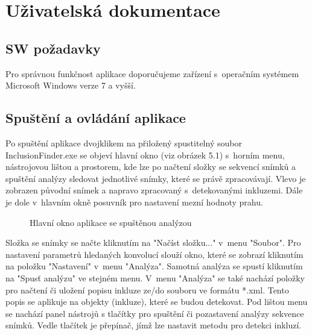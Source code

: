 \documentclass[12pt, a4paper]{report}
\begin{document}
\chapter{Uživatelská dokumentace}
	\section{SW požadavky}
	Pro správnou funkčnost aplikace doporučujeme zařízení s~operačním systémem Microsoft Windows verze 7 a vyšší.
	
	\section{Spuštění a ovládání aplikace}	
Po spuštění aplikace dvojklikem na přiložený spustitelný soubor InclusionFinder.exe se objeví hlavní okno (viz obrázek 5.1) s~horním menu, nástrojovou lištou a prostorem, kde lze po načtení složky se sekvencí snímků a spuštění analýzy sledovat jednotlivé snímky, které se právě zpracovávají. Vlevo je zobrazen původní snímek a napravo zpracovaný s~detekovanými inkluzemi. Dále je dole v~hlavním okně posuvník pro nastavení mezní hodnoty prahu.

	\begin{figure}[!htb]
	\centering
	\label{fig:hlavni_okno}
	\caption{Hlavní okno aplikace se spuštěnou analýzou}
	\end{figure}

Složka se snímky se načte kliknutím na "Načíst složku..." v~menu "Soubor". Pro nastavení parametrů hledaných konvolucí slouží okno, které se zobrazí kliknutím na položku "Nastavení" v~menu "Analýza". Samotná analýza se spustí kliknutím na "Spusť analýzu" ve stejném menu. V~menu "Analýza" se také nachází položky pro načtení či uložení popisu inkluze ze/do souboru ve formátu *.xml. Tento popis se aplikuje na objekty (inkluze), které se budou detekovat. Pod lištou menu se nachází panel nástrojů s tlačítky pro spuštění či pozastavení analýzy sekvence snímků. Vedle tlačítek je přepínač, jímž lze nastavit metodu pro detekci inkluzí.
\end{document}
